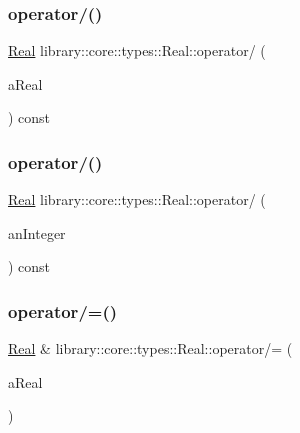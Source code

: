 \subsubsection{\texorpdfstring{operator/()}{operator/()}\hspace{0.1cm}{\footnotesize\ttfamily [2/3]}}
{\footnotesize\ttfamily \hyperlink{classlibrary_1_1core_1_1types_1_1_real}{Real} library\+::core\+::types\+::\+Real\+::operator/ (\begin{DoxyParamCaption}\item[{const \hyperlink{classlibrary_1_1core_1_1types_1_1_real_a9c5c8826b7e5a8e39544d23fea6c0e1c}{Real\+::\+Value\+Type} \&}]{a\+Real }\end{DoxyParamCaption}) const}

\mbox{\label{classlibrary_1_1core_1_1types_1_1_real_adfd83fd099289cfee3ab553f33f00e41}} 
\subsubsection{\texorpdfstring{operator/()}{operator/()}\hspace{0.1cm}{\footnotesize\ttfamily [3/3]}}
{\footnotesize\ttfamily \hyperlink{classlibrary_1_1core_1_1types_1_1_real}{Real} library\+::core\+::types\+::\+Real\+::operator/ (\begin{DoxyParamCaption}\item[{const \hyperlink{classlibrary_1_1core_1_1types_1_1_integer}{Integer} \&}]{an\+Integer }\end{DoxyParamCaption}) const}

\mbox{\label{classlibrary_1_1core_1_1types_1_1_real_adc661a93f109f10500738a77439c975d}} 
\subsubsection{\texorpdfstring{operator/=()}{operator/=()}\hspace{0.1cm}{\footnotesize\ttfamily [1/2]}}
{\footnotesize\ttfamily \hyperlink{classlibrary_1_1core_1_1types_1_1_real}{Real} \& library\+::core\+::types\+::\+Real\+::operator/= (\begin{DoxyParamCaption}\item[{const \hyperlink{classlibrary_1_1core_1_1types_1_1_real}{Real} \&}]{a\+Real }\end{DoxyParamCaption})}

